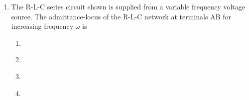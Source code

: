 \documentclass[journal]{IEEEtran}
\numberwithin{equation}{enumi}
\numberwithin{figure}{enumi}
\begin{document}
\begin{enumerate}
    \begin{figure}[H]
    \centering
    \resizebox{0.6\textwidth}{!}{}
    \end{figure}

    \begin{enumerate}
    \end{enumerate}

    \item 
    The R-L-C series circuit shown is supplied from a variable frequency voltage source. The admittance-locus of the R-L-C network at terminals AB for increasing frequency $\omega$ is

    \begin{figure}[H]
        \centering
        \resizebox{0.3\textwidth}{!}{}
    \end{figure}

        \begin{multicols}{2}
        \begin{enumerate}  
        
        \item 
        \begin{figure}[H]
        \centering
        \resizebox{0.3\textwidth}{!}{}
        \end{figure}
        \item 
        \begin{figure}[H]
        \centering
        \resizebox{0.3\textwidth}{!}{}
        \end{figure}
        
        \item 
        \begin{figure}[H]
        \centering
        \resizebox{0.26\textwidth}{!}{}
        \end{figure}
        

        \item 
        \begin{figure}[H]
        \centering
        \resizebox{0.26\textwidth}{!}{}
        \end{figure}
        

\end{enumerate}
\end{multicols}
\end{enumerate}
\end{document}
